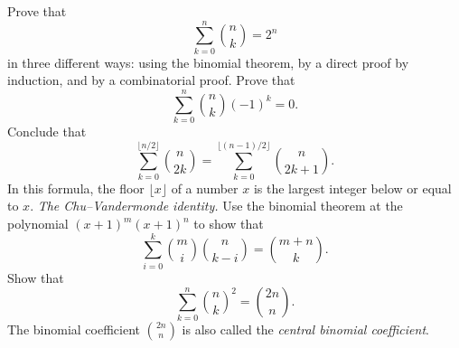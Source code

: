 \begin{exercises}
  \exercise Prove that
  \begin{equation*}
    \sum_{k=0}^n \binom{n}{k} = 2^n
  \end{equation*}
  in three different ways: using the binomial theorem, by a direct proof by induction, and by a combinatorial proof.
  \exercise Prove that
  \begin{equation*}
    \sum_{k=0}^n\binom{n}{k}(-1)^k = 0.
  \end{equation*}
  Conclude that
  \begin{equation*}
    \sum_{k=0}^{\lfloor n/2\rfloor}\binom{n}{2k} =\sum_{k=0}^{\lfloor (n-1)/2\rfloor}\binom{n}{2k+1}.
  \end{equation*}
  In this formula, the floor $\lfloor x\rfloor$ of a number $x$ is the largest integer below or equal to $x$.
  \exercise \emph{The Chu--Vandermonde identity.} Use the binomial theorem at the polynomial $(x+1)^m(x+1)^n$ to show that
  \begin{equation*}
    \sum_{i=0}^k \binom{m}{i}\binom{n}{k-i} = \binom{m+n}{k}.
  \end{equation*}
  \exercise Show that
  \begin{equation*}
    \sum_{k=0}^n \binom{n}{k}^2 = \binom{2n}{n}.
  \end{equation*}
  The binomial coefficient $\binom{2n}{n}$ is also called the \emph{central binomial coefficient}.
\end{exercises}

